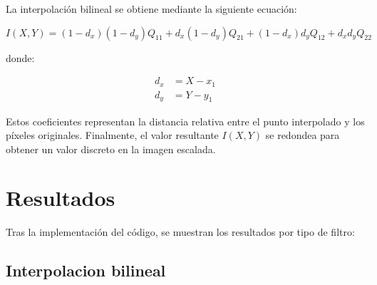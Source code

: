 \documentclass[11pt, letterpaper]{article}
\begin{document}
	La interpolación bilineal se obtiene mediante la siguiente ecuación:
	
	\begin{equation}
		I(X, Y) = (1 - d_x)(1 - d_y) Q_{11} + d_x (1 - d_y) Q_{21} + (1 - d_x) d_y Q_{12} + d_x d_y Q_{22}
	\end{equation}
	
	donde:
	
	\begin{align*}
		d_x &= X - x_1 \\
		d_y &= Y - y_1
	\end{align*}
	
	Estos coeficientes representan la distancia relativa entre el punto interpolado y los píxeles originales. Finalmente, el valor resultante $I(X, Y)$ se redondea para obtener un valor discreto en la imagen escalada.
	
	\newpage
	
	\section{Resultados}
	
	Tras la implementación del código, se muestran los resultados por tipo de filtro:
	
	\subsection{Interpolacion bilineal}
	
\end{document}
